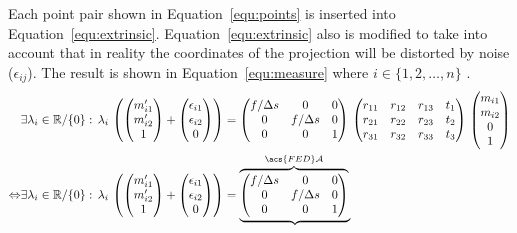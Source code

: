 \documentclass[12pt,a4paper,oneside,openright]{book}
\newcommand{\equ}[1]{Equation~\ref{equ:#1}}
\begin{document}
\begin{CJK}{UTF8}{}
Each point pair shown in \equ{points} is inserted into \equ{extrinsic}. \equ{extrinsic} also is modified to take into account that in reality the coordinates of the projection will be distorted by noise ($\epsilon_{ij}$). The result is shown in \equ{measure} where $i\in\{1,2,\ldots,n\}$ \citep{zhang2000flexible}.
\begin{align}
   &\exists\lambda_i\in\mathbb{R}/\{0\}:\,\lambda_i\,\begin{pmatrix}\begin{pmatrix}m^\prime_{i1}\\m^\prime_{i2}\\1\end{pmatrix}+
   \begin{pmatrix}\epsilon_{i1}\\\epsilon_{i2}\\0\end{pmatrix}\end{pmatrix}=
   \begin{pmatrix}f/\Delta s&0&0\\0&f/\Delta s&0\\0&0&1\end{pmatrix}\,
   \begin{pmatrix}r_{11}&r_{12}&r_{13}&t_1\\r_{21}&r_{22}&r_{23}&t_2\\r_{31}&r_{32}&r_{33}&t_3\end{pmatrix}\,
   \begin{pmatrix}m_{i1}\\m_{i2}\\0\\1\end{pmatrix}\label{equ:measure}\\
   \Leftrightarrow&\exists\lambda_i\in\mathbb{R}/\{0\}:\,\lambda_i\,\begin{pmatrix}\begin{pmatrix}m^\prime_{i1}\\m^\prime_{i2}\\1\end{pmatrix}+
   \begin{pmatrix}\epsilon_{i1}\\\epsilon_{i2}\\0\end{pmatrix}\end{pmatrix}=
   \displaystyle\underbrace{\overbrace{\begin{pmatrix}f/\Delta s&0&0\\0&f/\Delta s&0\\0&0&1\end{pmatrix}}^{\acs{FED}\mathcal{A}}\,
}
\end{align}
\end{CJK}
\end{document}
